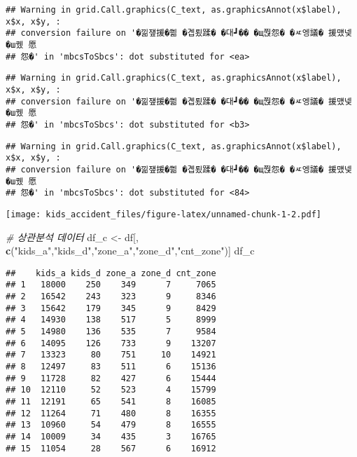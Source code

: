 \documentclass[
]{article}
\newenvironment{Shaded}{\begin{snugshade}}{\end{snugshade}}
\newcommand{\CommentTok}[1]{\textcolor[rgb]{0.56,0.35,0.01}{\textit{#1}}}
\newcommand{\KeywordTok}[1]{\textcolor[rgb]{0.13,0.29,0.53}{\textbf{#1}}}
\newcommand{\NormalTok}[1]{#1}
\newcommand{\StringTok}[1]{\textcolor[rgb]{0.31,0.60,0.02}{#1}}
\begin{document}
\begin{verbatim}
## Warning in grid.Call.graphics(C_text, as.graphicsAnnot(x$label), x$x, x$y, :
## conversion failure on '�낆쟾援�쁾 �곕룄蹂� �대┛�� �щ쭩怨� �ㅼ엥議� 援먰넻�ш퀬 愿
## 怨�' in 'mbcsToSbcs': dot substituted for <ea>
\end{verbatim}

\begin{verbatim}
## Warning in grid.Call.graphics(C_text, as.graphicsAnnot(x$label), x$x, x$y, :
## conversion failure on '�낆쟾援�쁾 �곕룄蹂� �대┛�� �щ쭩怨� �ㅼ엥議� 援먰넻�ш퀬 愿
## 怨�' in 'mbcsToSbcs': dot substituted for <b3>
\end{verbatim}

\begin{verbatim}
## Warning in grid.Call.graphics(C_text, as.graphicsAnnot(x$label), x$x, x$y, :
## conversion failure on '�낆쟾援�쁾 �곕룄蹂� �대┛�� �щ쭩怨� �ㅼ엥議� 援먰넻�ш퀬 愿
## 怨�' in 'mbcsToSbcs': dot substituted for <84>
\end{verbatim}

\texttt{[image: kids\_accident\_files/figure-latex/unnamed-chunk-1-2.pdf]}

\begin{Shaded}
\begin{Highlighting}[]
\CommentTok{# 상관분석 데이터}
\NormalTok{df_c <-}\StringTok{ }\NormalTok{df[, }\KeywordTok{c}\NormalTok{(}\StringTok{"kids_a"}\NormalTok{,}\StringTok{"kids_d"}\NormalTok{,}\StringTok{"zone_a"}\NormalTok{,}\StringTok{"zone_d"}\NormalTok{,}\StringTok{"cnt_zone"}\NormalTok{)]}
\NormalTok{df_c}
\end{Highlighting}
\end{Shaded}

\begin{verbatim}
##    kids_a kids_d zone_a zone_d cnt_zone
## 1   18000    250    349      7     7065
## 2   16542    243    323      9     8346
## 3   15642    179    345      9     8429
## 4   14930    138    517      5     8999
## 5   14980    136    535      7     9584
## 6   14095    126    733      9    13207
## 7   13323     80    751     10    14921
## 8   12497     83    511      6    15136
## 9   11728     82    427      6    15444
## 10  12110     52    523      4    15799
## 11  12191     65    541      8    16085
## 12  11264     71    480      8    16355
## 13  10960     54    479      8    16555
## 14  10009     34    435      3    16765
## 15  11054     28    567      6    16912
\end{verbatim}
\end{document}
